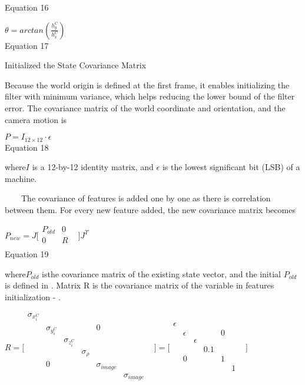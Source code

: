 Equation 16

$\theta =arctan(\frac{h_{y}^{C}}{h_{x}^{C}})$\\


Equation 17

Initialized the State Covariance Matrix

Because the world origin is defined at the first frame, it enables 
initializing the filter with minimum variance, which helps reducing the 
lower bound of the filter error. The covariance matrix of the world 
coordinate and orientation, and the camera motion is 

$P=I_{12\times 12}\cdot \epsilon $\\


Equation 18

where$I$ is a 12-by-12 identity matrix, and $\epsilon $ is the 
lowest significant bit (LSB) of a machine.

\ \ \ \ The covariance of features is added one by one as there is 
correlation between them. For every new feature added, the new 
covariance matrix becomes

$P_{new}=J\lbrack \begin{matrix}
P_{old} & 0 & \\
0 & R & \\
\end{matrix}
\rbrack J^{T}$\\


Equation 19

where$P_{old}$ isthe covariance matrix of the existing state vector, 
and the initial $P_{old}$is defined in . Matrix R is the covariance 
matrix of the variable in features initialization - .

$R=\lbrack \begin{matrix}
\sigma _{x_{i}^{C}} & & & & & & \\
 & \sigma _{y_{i}^{C}} & & & 0 & & \\
 & & \sigma _{z_{i}^{C}} & & & & \\
 & & & \sigma _{\rho } & & & \\
 & 0 & & & \sigma _{image} & & \\
 & & & & & \sigma _{image} & \\
\end{matrix}
\rbrack =\lbrack \begin{matrix}
\epsilon & & & & & & \\
 & \epsilon & & & 0 & & \\
 & & \epsilon & & & & \\
 & & & 0.1 & & & \\
 & 0 & & & 1 & & \\
 & & & & & 1 & \\
\end{matrix}
\rbrack $\\


